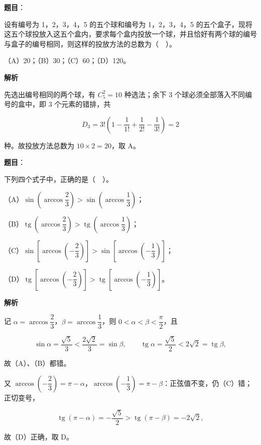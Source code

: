 \begin{answer}

\textbf{题目}：

设有编号为 1，2，3，4，5 的五个球和编号为 1，2，3，4，5 的五个盒子，现将这五个球投放入这五个盒内，要求每个盒内投放一个球，并且恰好有两个球的编号与盒子的编号相同，则这样的投放方法的总数为（　）。

（A）20；（B）30；（C）60；（D）120。

\textbf{解析}

先选出编号相同的两个球，有 $C_{5}^{2}=10$ 种选法；余下 3 个球必须全部落入不同编号的盒中，即 3 个元素的错排，共

\nopagebreak[4]
\[
D_{3}=3!\left(1-\frac{1}{1!}+\frac{1}{2!}-\frac{1}{3!}\right)=2
\]

种。故投放方法总数为 $10\times 2=20$，取 A。


\end{answer}
\begin{answer}

\textbf{题目}：

下列四个式子中，正确的是（　）。

（A）$\sin\left(\arccos\dfrac{2}{3}\right)>\sin\left(\arccos\dfrac{1}{3}\right)$；

（B）$\operatorname{tg}\left(\arccos\dfrac{2}{3}\right)>\operatorname{tg}\left(\arccos\dfrac{1}{3}\right)$；

（C）$\sin\left[\arccos\left(-\dfrac{2}{3}\right)\right]>\sin\left[\arccos\left(-\dfrac{1}{3}\right)\right]$；

（D）$\operatorname{tg}\left[\arccos\left(-\dfrac{2}{3}\right)\right]>\operatorname{tg}\left[\arccos\left(-\dfrac{1}{3}\right)\right]$。

\textbf{解析}

记 $\alpha=\arccos\dfrac{2}{3}$，$\beta=\arccos\dfrac{1}{3}$，则 $0<\alpha<\beta<\dfrac{\pi}{2}$，且

\nopagebreak[4]
\[
\sin\alpha=\frac{\sqrt{5}}{3}<\frac{2\sqrt{2}}{3}=\sin\beta,\qquad
\operatorname{tg}\alpha=\frac{\sqrt{5}}{2}<2\sqrt{2}=\operatorname{tg}\beta,
\]

故（A）、（B）都错。

又 $\arccos\left(-\dfrac{2}{3}\right)=\pi-\alpha$，$\arccos\left(-\dfrac{1}{3}\right)=\pi-\beta$：正弦值不变，仍（C）错；正切变号，

\nopagebreak[4]
\[
\operatorname{tg}(\pi-\alpha)=-\frac{\sqrt{5}}{2}>\operatorname{tg}(\pi-\beta)=-2\sqrt{2},
\]

故（D）正确，取 D。


\end{answer}
